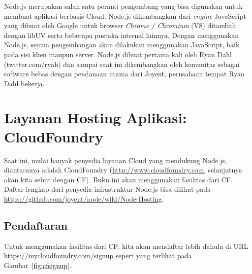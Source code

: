 Node.js merupakan salah satu peranti pengembang yang bisa digunakan untuk membuat aplikasi berbasis Cloud. Node.js dikembangkan dari \textit{engine} JavaScript yang dibuat oleh Google untuk browser \textit{Chrome / Chromium} (V8) ditambah dengan libUV serta beberapa pustaka internal lainnya. Dengan menggunakan Node.js, semua pengembangan akan dilakukan menggunakan JavaScript, baik pada sisi klien maupun server. Node.js dibuat pertama kali oleh Ryan Dahl (twitter.com/ryah) dan sampai saat ini dikembangkan oleh komunitas sebagai software bebas dengan pendanaan utama dari Joyent, perusahaan tempat Ryan Dahl bekerja.

\section{Layanan Hosting Aplikasi: CloudFoundry}

Saat ini, mulai banyak penyedia layanan Cloud yang mendukung Node.js, diantaranya adalah CloudFoundry (\url{http://www.cloudfoundry.com}, selanjutnya akan kita sebut dengan CF). Buku ini akan menggunakan fasilitas dari CF. Daftar lengkap dari penyedia infrastruktur Node.js bisa dilihat pada \url{https://github.com/joyent/node/wiki/Node-Hosting}.

\subsection{Pendaftaran}

Untuk menggunakan fasilitas dari CF, kita akan mendaftar lebih dahulu di URL \url{https://mycloudfoundry.com/signup} sepert yang terlihat pada Gambar~\ref{fig:cfsignup}.

